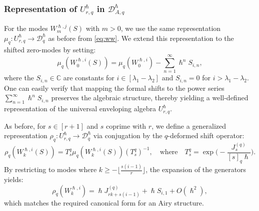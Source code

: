 \documentclass[reqno,11pt]{amsart}
\theoremstyle{plain}
\theoremstyle{definition}
\theoremstyle{remark}
\numberwithin{equation}{section}
\newcommand{\1}{\mathds{1}}
\newcommand{\2}{\frac{1}{2}}
\begin{document}
{				\subsubsection{Representation of $U^\hslash_{r,q}$ in $\mathcal{D}_{A,q}^\hslash$}
				For the modes $W^{\hslash,j}_m(S)$ with $m >0$, we use the same representation $\mu_q: U^\hslash_{r,q}\to \mathcal{D}_{q}^\hslash$ as before from \eqref{eq:ww}. We extend this representation to the shifted zero-modes by setting:
				\begin{equation}
					\mu_q(W^{\hslash,i}_0(S) ) = \mu_q(W^{\hslash,i}_0) - \sum_{n=1}^\infty \hslash^n S_{i,n},
				\end{equation}
				where the $S_{i,n} \in \mathbb{C}$ are constants for $i \in [\lambda_1-\lambda_2]$ and $S_{i,n} = 0$ for $i > \lambda_1-\lambda_2$. One can easily verify that mapping the formal shifts to the power series $\sum_{n=1}^\infty \hslash^n S_{i,n}$ preserves the algebraic structure, thereby yielding a well-defined representation of the universal enveloping algebra $U^\hslash_{r,q}$.
				
				As before, for $ s \in [r+1]$ and $s$ coprime with $r$,
				we  define a generalized representation  $\rho_q: U^\hslash_{r,q} \to \mathcal{D}_{q}^\hslash$ via conjugation by the $q$-deformed shift operator:
				\begin{equation}\label{eq:rep2}
					\rho_q( W^{\hslash,i}_k(S)) = T^q_s \mu_q(W^{\hslash,i}_k(S)) (T^q_s)^{-1}, \quad \mbox{where} \quad T^q_s = \exp \Big( -\frac{J^{(q)}_s}{[s]_q\hslash} \Big).
				\end{equation}
				By restricting to modes where $k  \geq - \lfloor \frac{s(i-1)}{r} \rfloor $, the expansion of the generators yields:
				\begin{equation}
					\rho_q( W^{\hslash,i}_k) = \hslash J^{(q)}_{r k + s (i-1)} + \hslash S_{i,1} + O(\hslash^2),
				\end{equation}
				which matches the required canonical form for an Airy structure.
				
}
\end{document}
